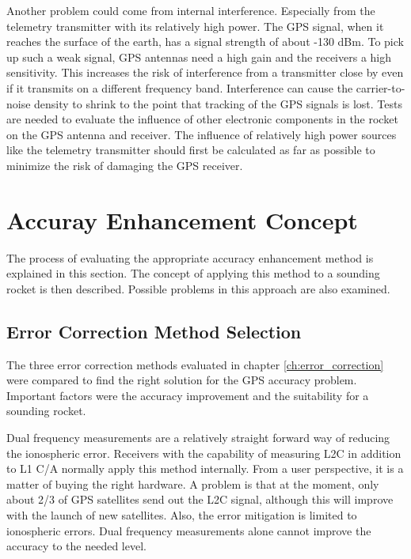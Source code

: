 Another problem could come from internal interference.
Especially from the telemetry transmitter with its relatively high power.
The GPS signal, when it reaches the surface of the earth, has a signal strength of about -130 dBm.
To pick up such a weak signal, GPS antennas need a high gain and the receivers a high sensitivity.
This increases the risk of interference from a transmitter close by even if it transmits on a different frequency band.
Interference can cause the carrier-to-noise density to shrink to the point that tracking of the GPS signals is lost.
Tests are needed to evaluate the influence of other electronic components in the rocket on the GPS antenna and receiver.
The influence of relatively high power sources like the telemetry transmitter should first be calculated as far as possible to minimize the risk of damaging the GPS receiver.


\section{Accuray Enhancement Concept}

The process of evaluating the appropriate accuracy enhancement method is explained in this section.
The concept of applying this method to a sounding rocket is then described.
Possible problems in this approach are also examined.

\subsection{Error Correction Method Selection}

The three error correction methods evaluated in chapter \ref{ch:error_correction} were compared to find the right solution for the GPS accuracy problem.
Important factors were the accuracy improvement and the suitability for a sounding rocket.

Dual frequency measurements are a relatively straight forward way of reducing the ionospheric error.
Receivers with the capability of measuring L2C in addition to L1 C/A normally apply this method internally.
From a user perspective, it is a matter of buying the right hardware.
A problem is that at the moment, only about 2/3 of GPS satellites send out the L2C signal, although this will improve with the launch of new satellites.
Also, the error mitigation is limited to ionospheric errors.
Dual frequency measurements alone cannot improve the accuracy to the needed level.

